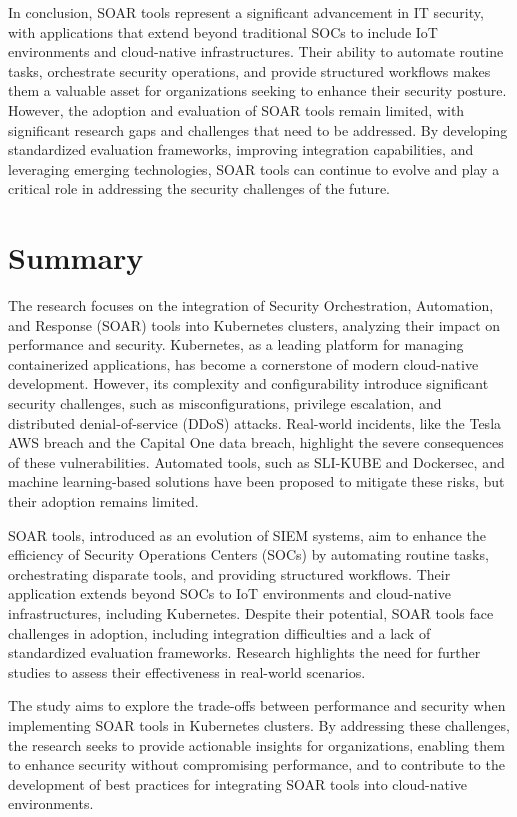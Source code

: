 In conclusion, SOAR tools represent a significant advancement in IT security, with applications that extend beyond traditional SOCs to include IoT environments and cloud-native infrastructures. Their ability to automate routine tasks, orchestrate security operations, and provide structured workflows makes them a valuable asset for organizations seeking to enhance their security posture. However, the adoption and evaluation of SOAR tools remain limited, with significant research gaps and challenges that need to be addressed. By developing standardized evaluation frameworks, improving integration capabilities, and leveraging emerging technologies, SOAR tools can continue to evolve and play a critical role in addressing the security challenges of the future.

\section{Summary}

The research focuses on the integration of Security Orchestration, Automation, and Response (SOAR) tools into Kubernetes clusters, analyzing their impact on performance and security. Kubernetes, as a leading platform for managing containerized applications, has become a cornerstone of modern cloud-native development. However, its complexity and configurability introduce significant security challenges, such as misconfigurations, privilege escalation, and distributed denial-of-service (DDoS) attacks. Real-world incidents, like the Tesla AWS breach and the Capital One data breach, highlight the severe consequences of these vulnerabilities. Automated tools, such as SLI-KUBE and Dockersec, and machine learning-based solutions have been proposed to mitigate these risks, but their adoption remains limited.

SOAR tools, introduced as an evolution of SIEM systems, aim to enhance the efficiency of Security Operations Centers (SOCs) by automating routine tasks, orchestrating disparate tools, and providing structured workflows. Their application extends beyond SOCs to IoT environments and cloud-native infrastructures, including Kubernetes. Despite their potential, SOAR tools face challenges in adoption, including integration difficulties and a lack of standardized evaluation frameworks. Research highlights the need for further studies to assess their effectiveness in real-world scenarios.

The study aims to explore the trade-offs between performance and security when implementing SOAR tools in Kubernetes clusters. By addressing these challenges, the research seeks to provide actionable insights for organizations, enabling them to enhance security without compromising performance, and to contribute to the development of best practices for integrating SOAR tools into cloud-native environments.
